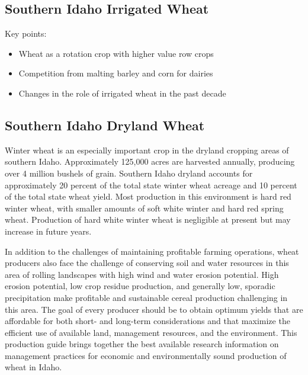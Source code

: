 \documentclass[
  letterpaper,
  DIV=11,
  numbers=noendperiod]{scrreprt}
\providecommand{\tightlist}{%
  \setlength{\itemsep}{0pt}\setlength{\parskip}{0pt}}\usepackage{longtable,booktabs,array}
\begin{document}
\subsection{Southern Idaho Irrigated
Wheat}\label{southern-idaho-irrigated-wheat}

Key points:

\begin{itemize}
\tightlist
\item
  Wheat as a rotation crop with higher value row crops\\
\item
  Competition from malting barley and corn for dairies\\
\item
  Changes in the role of irrigated wheat in the past decade
\end{itemize}

\subsection{Southern Idaho Dryland
Wheat}\label{southern-idaho-dryland-wheat}

Winter wheat is an especially important crop in the dryland cropping
areas of southern Idaho. Approximately 125,000 acres are harvested
annually, producing over 4 million bushels of grain. Southern Idaho
dryland accounts for approximately 20 percent of the total state winter
wheat acreage and 10 percent of the total state wheat yield. Most
production in this environment is hard red winter wheat, with smaller
amounts of soft white winter and hard red spring wheat. Production of
hard white winter wheat is negligible at present but may increase in
future years.

In addition to the challenges of maintaining profitable farming
operations, wheat producers also face the challenge of conserving soil
and water resources in this area of rolling landscapes with high wind
and water erosion potential. High erosion potential, low crop residue
production, and generally low, sporadic precipitation make profitable
and sustainable cereal production challenging in this area. The goal of
every producer should be to obtain optimum yields that are affordable
for both short- and long-term considerations and that maximize the
efficient use of available land, management resources, and the
environment. This production guide brings together the best available
research information on management practices for economic and
environmentally sound production of wheat in Idaho.
\end{document}

